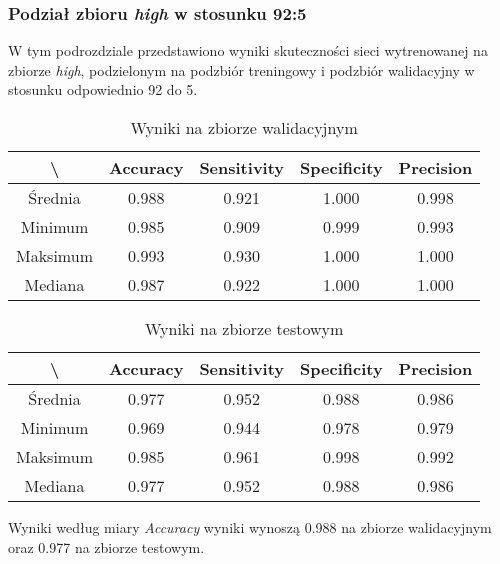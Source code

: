 \subsubsection{Podział zbioru \textit{high} w stosunku 92:5}

W tym podrozdziale przedstawiono wyniki skuteczności sieci wytrenowanej na zbiorze \textit{high}, podzielonym na podzbiór treningowy i podzbiór walidacyjny w stosunku odpowiednio 92 do 5.

\begin{table}[H]
	\centering
	\caption{Wyniki na zbiorze walidacyjnym}
	\vspace{6pt}
	{\footnotesize
		\begin{tabular}{|c|c|c|c|c|}
      \hline \textbackslash & Accuracy & Sensitivity & Specificity & Precision \\
      \hline Średnia & 0.988 & 0.921 & 1.000 & 0.998 \\
      \hline Minimum & 0.985 & 0.909 & 0.999 & 0.993 \\
      \hline Maksimum & 0.993 & 0.930 & 1.000 & 1.000 \\
      \hline Mediana & 0.987 & 0.922 & 1.000 & 1.000 \\
      \hline
		\end{tabular}
	}
	\vspace{0pt}
\end{table}

\begin{table}[H]
	\centering
	\caption{Wyniki na zbiorze testowym}
	\vspace{6pt}
	{\footnotesize
		\begin{tabular}{|c|c|c|c|c|}
      \hline \textbackslash & Accuracy & Sensitivity & Specificity & Precision \\
      \hline Średnia & 0.977 & 0.952 & 0.988 & 0.986 \\
      \hline Minimum & 0.969 & 0.944 & 0.978 & 0.979 \\
      \hline Maksimum & 0.985 & 0.961 & 0.998 & 0.992 \\
      \hline Mediana & 0.977 & 0.952 & 0.988 & 0.986 \\
      \hline
		\end{tabular}
	}
	\vspace{0pt}
\end{table}

Wyniki według miary \textit{Accuracy} wyniki wynoszą 0.988 na zbiorze walidacyjnym oraz 0.977 na zbiorze testowym.
